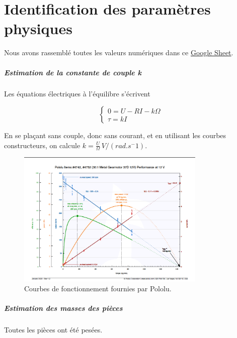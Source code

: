 \documentclass{report}
\begin{document}
\chapter{Identification des paramètres physiques}

Nous avons rassemblé toutes les valeurs numériques dans ce 
\href{https://docs.google.com/spreadsheets/d/1PVCPAeFXgacQK3YaMxcYYtDlWB_0VT0cpRnJDznpAQc/edit?pli=1#gid=0
}{Google Sheet}.

\paragraph{Estimation de la constante de couple k}

Les équations électriques à l'équilibre s'écrivent

\begin{equation*}
    \begin{cases}
        0 = U - RI - k\Omega \\
        \tau = kI       
    \end{cases}
\end{equation*}

En se plaçant sans couple, donc sans courant, 
et en utilisant les courbes constructeurs, on calcule
$k=\frac{U}{\Omega} \, V/(rad.s^-1)$.

\begin{figure}[h]  %
    \centering
    \includegraphics[width=9cm]{figures/courbes-construc.png}


    \caption{Courbes de fonctionnement fournies par Pololu.}
\end{figure}

\paragraph{Estimation des masses des pièces}
Toutes les pièces ont été pesées.
\end{document}
